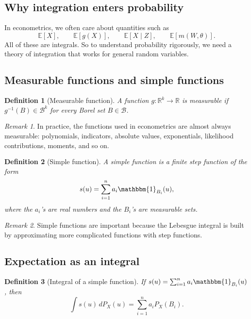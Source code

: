\documentclass[11pt]{article}
\newtheorem{definition}{Definition}[section]
\theoremstyle{remark}
\newtheorem{remark}{Remark}[section]
\newcommand{\R}{\mathbb{R}}
\newcommand{\EE}{\mathbb{E}}
\newcommand{\1}{\mathbbm{1}}
\newcommand{\cB}{\mathcal{B}}
\begin{document}
\subsection{Why integration enters probability}

In econometrics, we often care about quantities such as
\[
  \EE[X], \qquad \EE[g(X)], \qquad \EE[X \mid Z], \qquad \EE[m(W,\theta)].
\]
All of these are integrals. So to understand probability rigorously, we need a theory of integration that works for general random variables.

\subsection{Measurable functions and simple functions}

\begin{definition}[Measurable function]
A function \(g:\R^k \to \R\) is measurable if \(g^{-1}(B)\in \cB^k\) for every Borel set \(B\in \cB\).
\end{definition}

\begin{remark}
In practice, the functions used in econometrics are almost always measurable: polynomials, indicators, absolute values, exponentials, likelihood contributions, moments, and so on.
\end{remark}

\begin{definition}[Simple function]
A \emph{simple function} is a finite step function of the form
\[
  s(u)=\sum_{i=1}^{n} a_i \1_{B_i}(u),
\]
where the \(a_i\)'s are real numbers and the \(B_i\)'s are measurable sets.
\end{definition}

\begin{remark}
Simple functions are important because the Lebesgue integral is built by approximating more complicated functions with step functions.
\end{remark}

\subsection{Expectation as an integral}

\begin{definition}[Integral of a simple function]
If \(s(u)=\sum_{i=1}^{n} a_i \1_{B_i}(u)\), then
\[
  \int s(u)\,dP_X(u)=\sum_{i=1}^{n} a_i P_X(B_i).
\]
\end{definition}
\end{document}
